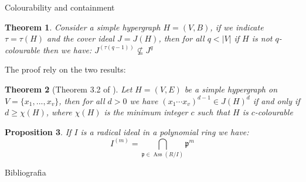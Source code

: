 \documentclass{beamer}
\theoremstyle{plain}
\newtheorem{teo}{Theorem}[section]
\newtheorem{prop}[teo]{Proposition}
\theoremstyle{remark}
\theoremstyle{definition}
\newcommand{\p}{\mathfrak{p}}
\newcommand{\mm}{\mathfrak{m}}
\DeclareMathOperator{\Ass}{Ass}
\begin{document}
\begin{frame}{Colourability and containment}
\begin{teo} \label{teo:borin1}
	Consider a simple hypergraph $H = (V,B)$, if we indicate $\tau = \tau (H)$ and the cover ideal $ J = J(H)$,  then for all $ q < |V|$ if $ H $ is not $ q $-colourable then we have: 
$ J^{( \tau(q-1) )} \not \subseteq J^q $
\end{teo}
\end{frame}

\begin{frame}
The proof rely on the two results:
\begin{teo}[Theorem 3.2 of \cite{Fran10Colourings}] \label{teo:col:chi}
Let $ H = (V,E) $ be a simple hypergraph on $ V = \{ x_1 , ... , x_v\} $, then for all $ d >0 $ we have $ (x_1 \cdots x_v)^{d-1} \in J(H)^d $ if and only if $ d \geq \chi(H) $, where $ \chi(H) $ is the minimum integer $ c $ such that $ H $ is $ c $-colourable
\end{teo}
\begin{prop}\label{teo:sym_radical}
If $ I $ is a radical ideal in a polynomial ring we have:
\begin{equation}
		I^{(m)} = \bigcap_{\p \in \Ass(R/I) } \p^m
	\end{equation}
\end{prop}
\end{frame}

\begin{frame}[allowframebreaks]{Bibliografia}
			\printbibliography[heading=none, notcategory=fullcited]	
\end{frame}
\end{document}
